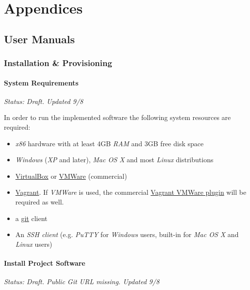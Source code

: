 \chapter*{Appendices}
\renewcommand{\thesection}{\Alph{section}}

\section{User Manuals}

\subsection{Installation \& Provisioning}

\subsubsection{System Requirements}

\emph{Status: Draft. Updated 9/8}

In order to run the implemented software the following system resources are required:

\begin{itemize}
\item \emph{x86} hardware with at least 4GB \emph{RAM} and 3GB free disk space
\item \emph{Windows} (\emph{XP} and later), \emph{Mac OS X} and most \emph{Linux} distributions
\item \href{https://www.virtualbox.org/wiki/Downloads}{VirtualBox} or \href{http://www.vmware.com/products/fusion/}{VMWare} (commercial)
\item \href{http://www.vagrantup.com/downloads.html}{Vagrant}. If \emph{VMWare} is used, the commercial \href{https://www.vagrantup.com/vmware}{Vagrant VMWare plugin} will be required as well.
\item a \href{https://git-scm.com/}{git} client
\item An \emph{SSH client} (e.g. \emph{PuTTY} for \emph{Windows} users, built-in for \emph{Mac OS X} and \emph{Linux} users)
\end{itemize}

\subsubsection{Install Project Software}

\emph{Status: Draft. Public Git URL missing. Updated 9/8}

